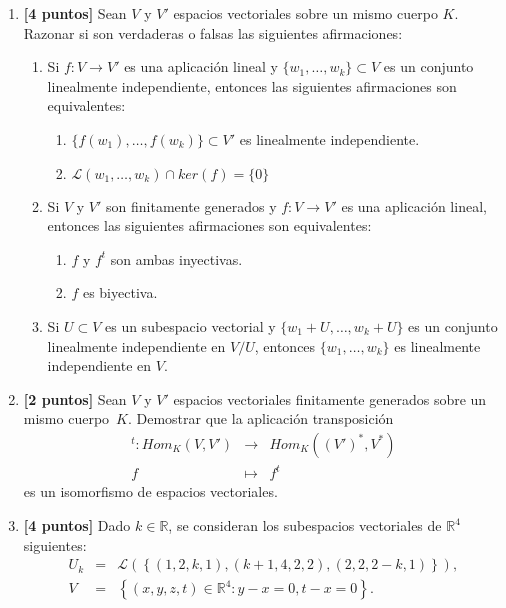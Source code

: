 \documentclass[12pt]{article}
\begin{document}
    \begin{enumerate}
\addtolength{\itemsep}{1.5em}
    \item \textbf{[4 puntos]} Sean $V$ y $V'$ espacios vectoriales sobre un mismo cuerpo $K$. Razonar si son verdaderas o falsas las siguientes afirmaciones:
    \begin{enumerate}
    \addtolength{\itemsep}{1em}
        \item Si $f:V\to V'$ es una aplicación lineal y $\{w_1,\dots,w_k\}\subset V$ es un conjunto linealmente independiente, entonces las siguientes afirmaciones son equivalentes:
        \begin{enumerate}
            \item $\{f(w_1),\dots,f(w_k)\} \subset V'$ es linealmente independiente.

            \item $\mathcal{L}(w_1,\dots,w_k)\cap ker(f)=\{0\}$
        \end{enumerate}

        \item Si $V$ y $V'$ son finitamente generados y $f:V\to V'$ es una aplicación lineal, entonces las siguientes afirmaciones son equivalentes:
        \begin{enumerate}
            \item $f$ y $f^t$ son ambas inyectivas.
            \item $f$ es biyectiva.
        \end{enumerate}

        \item Si $U \subset V$ es un subespacio vectorial y $\{w_1+U,\dots,w_k+U\}$ es un conjunto linealmente independiente en $V/U$, entonces $\{w_1,\dots,w_k\}$ es linealmente independiente en $V$.
    \end{enumerate}

    \item \textbf{[2 puntos]} Sean $V$ y $V'$ espacios vectoriales finitamente generados sobre un mismo cuerpo~$K$. Demostrar que la aplicación transposición
    \begin{equation*}
    \begin{array}{rcl}
        ^t:Hom_K(V,V') & \longrightarrow & Hom_K((V')^*,V^*)\\
        f & \longmapsto & f^t
    \end{array}
    \end{equation*}
    es un isomorfismo de espacios vectoriales.
       

    \item \textbf{[4 puntos]} Dado $k\in \mathbb{R}$, se consideran los subespacios vectoriales de $\mathbb{R}^4$ siguientes:
    \begin{equation*}
    \begin{array}{rcl}
        U_k & = & \mathcal{L}\left( \left\{ (1,2,k,1),(k+1,4,2,2),(2,2,2-k,1) \right\}\right), \\
        V & = & \left\{(x,y,z,t)\in \mathbb{R}^4 : y-x=0, t-x=0 \right\}.
    \end{array}
    \end{equation*}


\end{enumerate}
\end{document}
